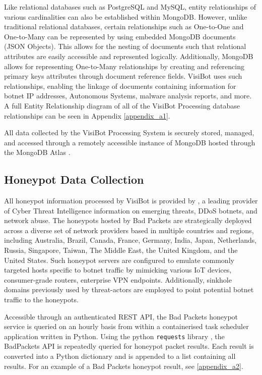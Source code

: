 Like relational databases such as PostgreSQL and MySQL, entity relationships of various cardinalities can also be established within MongoDB. However, unlike traditional relational databases, certain relationships such as One-to-One and One-to-Many can be represented by using embedded MongoDB documents (JSON Objects). This allows for the nesting of documents such that relational attributes are easily accessible and represented logically. Additionally, MongoDB allows for representing One-to-Many relationships by creating and referencing primary keys attributes through document reference fields. VisiBot uses such relationships, enabling the linkage of documents containing information for botnet IP addresses, Autonomous Systems, malware analysis reports, and more. A full Entity Relationship diagram of all of the VisiBot Processing database relationships can be seen in Appendix \ref{appendix_a1}.

All data collected by the VisiBot Processing System is securely stored, managed, and accessed through a remotely accessible instance of MongoDB hosted through the MongoDB Atlas \citep{MongoDBAtlas}.

\subsection{Honeypot Data Collection}

All honeypot information processed by VisiBot is provided by \citet{BadPackets}, a leading provider of Cyber Threat Intelligence information on emerging threats, DDoS botnets, and network abuse. The honeypots hosted by Bad Packets are strategically deployed across a diverse set of network providers based in multiple countries and regions, including Australia, Brazil, Canada, France, Germany, India, Japan, Netherlands, Russia, Singapore, Taiwan, The Middle East, the United Kingdom, and the United States. Such honeypot servers are configured to emulate commonly targeted hosts specific to botnet traffic by mimicking various IoT devices, consumer-grade routers, enterprise VPN endpoints. Additionally, sinkhole domains previously used by threat-actors are employed to point potential botnet traffic to the honeypots.

Accessible through an authenticated REST API, the Bad Packets honeypot service is queried on an hourly basis from within a containerised task scheduler application written in Python. Using the python \texttt{requests} library \citep{PythonRequests}, the BadPackets API is repeatedly queried for honeypot packet results. Each result is converted into a Python dictionary and is appended to a list containing all results. For an example of a Bad Packets honeypot result, see \ref{appendix_a2}.

